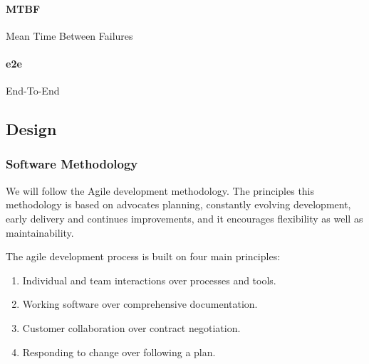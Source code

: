 			\paragraph{MTBF} Mean Time Between Failures
			\paragraph{e2e} End-To-End



\subsection{Design}

	\subsubsection{Software Methodology}
	We will follow the Agile development methodology. The principles this methodology is based on advocates planning, constantly evolving development, early delivery and continues improvements, and it encourages flexibility as well as maintainability.

	\begin{flushleft}
	The agile development process is built on four main principles:
		\begin{enumerate}
			\item Individual and team interactions over processes and tools.
			\item Working software over comprehensive documentation.
			\item Customer collaboration over contract negotiation.
			\item Responding to change over following a plan.
		\end{enumerate}
	\end{flushleft}

